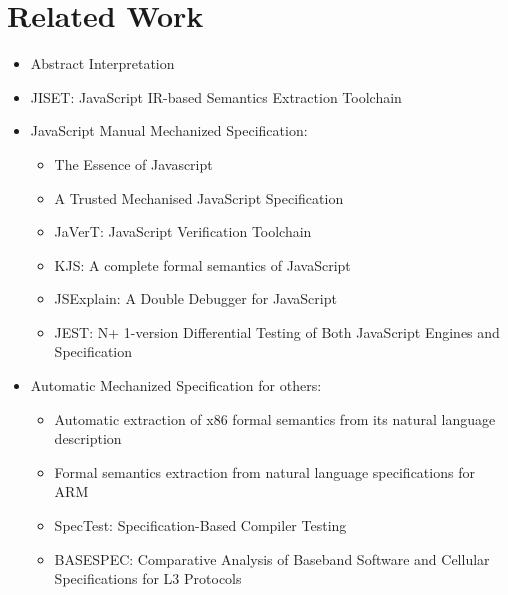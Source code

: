 \section{Related Work}\label{sec:related}

\begin{itemize}
  \item Abstract Interpretation~\cite{ai1977, ai1992}
  \item JISET: JavaScript IR-based Semantics Extraction Toolchain~\cite{jiset}
  \item JavaScript Manual Mechanized Specification:
    \begin{itemize}
      \item The Essence of Javascript~\cite{lambdajs}
      \item A Trusted Mechanised JavaScript Specification~\cite{jscert}
      \item JaVerT: JavaScript Verification Toolchain~\cite{javert}
      \item KJS: A complete formal semantics of JavaScript~\cite{kjs}
      \item JSExplain: A Double Debugger for JavaScript~\cite{jsexplain}
      \item JEST: N+ 1-version Differential Testing of Both JavaScript Engines
        and Specification~\cite{jest}
    \end{itemize}
  \item Automatic Mechanized Specification for others:
    \begin{itemize}
      \item Automatic extraction of x86 formal semantics from its natural
        language description~\cite{x86}
      \item Formal semantics extraction from natural language specifications for
        ARM~\cite{arm}
      \item SpecTest: Specification-Based Compiler Testing~\cite{spectest}
      \item BASESPEC: Comparative Analysis of Baseband Software and Cellular
        Specifications for L3 Protocols~\cite{basespec}
    \end{itemize}
\end{itemize}
